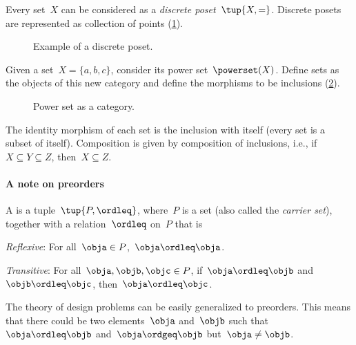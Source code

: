 \begin{example}
    \label{ex:discreteposet}
    Every set~$X$ can be considered as a \emph{discrete poset}~$\tup{X,=}$. Discrete posets are represented as collection of points (\cref{fig:discretepos}).

    \begin{figure}[tbh]
        \centering
        \caption{Example of a discrete poset. \label{fig:discretepos}}
    \end{figure}

    \begin{example}
        \label{ex:hasseinclusion}
        Given a set~$X=\{a,b,c\}$, consider its power set~$\powerset(X)$. Define sets as the objects of this new category and define the morphisms to be inclusions (\cref{fig:powersetcat}).

        \begin{figure}[h!]
            \begin{center}
            \end{center}
            \caption{Power set as a category.}
            \label{fig:powersetcat}
        \end{figure}

        The identity morphism of each set is the inclusion with itself (every set is a subset of itself). Composition is given by composition of inclusions, i.e., if~$X\subseteq Y \subseteq Z$, then~$X\subseteq Z$.
    \end{example}
\end{example}

\paragraph{A note on preorders}
\begin{definition}[Preorder]
    \label{def:preorder}
    A \emph{} is a tuple~$\tup{P, \ordleq}$,
    where~$P$ is a set (also called the \emph{carrier set}), together with a
    relation~$\ordleq$ on~$P$ that is
    \begin{compactenum}
        \item \emph{Reflexive}: For all~$\obja\in P$,~$\obja\ordleq \obja$.
        \item \emph{Transitive}: For all~$\obja,\objb,\objc\in P$, if~$\obja\ordleq \objb$ and~$\objb\ordleq \objc$, then~$\obja\ordleq \objc$.
    \end{compactenum}
\end{definition}
The theory of design problems can be easily generalized to preorders. This means that there could be two elements~$\obja$ and~$\objb$ such that~$\obja\ordleq \objb$ and~$\obja \ordgeq \objb$ but~$\obja \neq \objb$.

